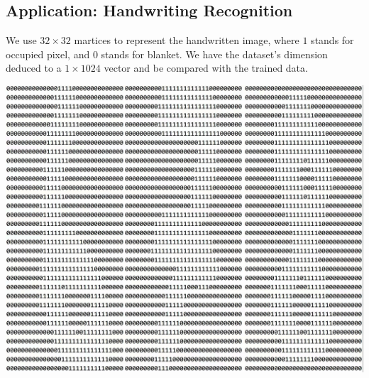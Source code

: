 \documentclass[UTF8]{article}
\begin{document}
\subsection{Application: Handwriting Recognition}
We use $32 \times 32$ martices to represent the handwritten image, where $1$ stands for occupied pixel, and $0$ stands for blanket. We have the dataset's dimension deduced to a $1\times1024$ vector and be compared with the trained data.
\begin{center}
    \includegraphics[width = 0.5\linewidth]{Note Files/HWR.jpg}
\end{center}

\end{document}
